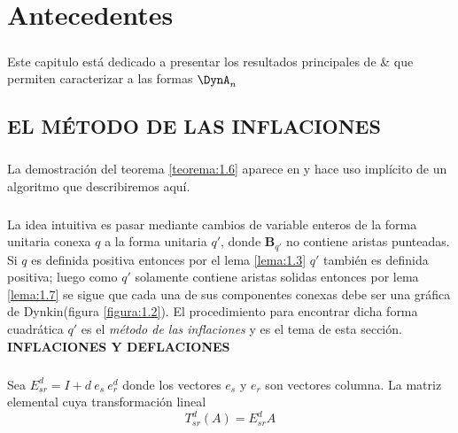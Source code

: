 \chapter{Antecedentes}

\paragraph{}
Este capitulo está dedicado a presentar los resultados principales de \citep{alma991031505829703276} \& \citep{Barot1999ACO} que permiten caracterizar a las formas $\DynA_{n}$

\section{EL MÉTODO DE LAS INFLACIONES}\label{sec:2.1}

\paragraph{}
La demostración del teorema \ref{teorema:1.6} aparece en \citep{alma991031505829703276} y hace uso implícito de un algoritmo que describiremos aquí.

\paragraph{}
La idea intuitiva es pasar mediante cambios de variable enteros de la forma unitaria conexa $q$ a la forma unitaria $q'$, donde $\textbf{B}_{q'}$ no contiene aristas punteadas. Si $q$ es definida positiva entonces por el lema \ref{lema:1.3} $q'$ también es definida positiva; luego como $q'$ solamente contiene aristas solidas entonces por lema \ref{lema:1.7} se sigue que cada una de sus componentes conexas debe ser una gráfica de Dynkin(figura \ref{figura:1.2}). El procedimiento para encontrar dicha forma cuadrática $q'$ es el \textit{método de las inflaciones} y es el tema de esta sección.\\

\textbf{INFLACIONES Y DEFLACIONES}

\paragraph{}
Sea $E_{sr}^{d} = I + d~e_{s}~e_{r}^{d}$ donde los vectores $e_{s}$ y $e_{r}$ son vectores columna. La matriz elemental cuya transformación lineal 
\begin{equation*}
    T_{sr}^{d}\left(A\right) = E_{sr}^{d}A
\end{equation*}

